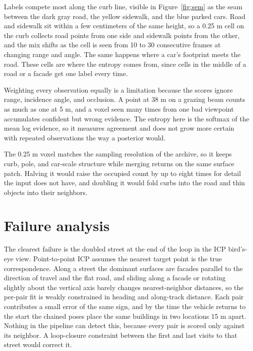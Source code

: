 \documentclass[11pt]{article}
\begin{document}
Labels compete most along the curb line, visible in Figure~\ref{fig:sem} as the seam between the dark gray road, the yellow sidewalk, and the blue parked cars. Road and sidewalk sit within a few centimeters of the same height, so a 0.25 m cell on the curb collects road points from one side and sidewalk points from the other, and the mix shifts as the cell is seen from 10 to 30 consecutive frames at changing range and angle. The same happens where a car's footprint meets the road. These cells are where the entropy comes from, since cells in the middle of a road or a facade get one label every time.

Weighting every observation equally is a limitation because the scores ignore range, incidence angle, and occlusion. A point at 38 m on a grazing beam counts as much as one at 5 m, and a voxel seen many times from one bad viewpoint accumulates confident but wrong evidence. The entropy here is the softmax of the mean log evidence, so it measures agreement and does not grow more certain with repeated observations the way a posterior would.

The 0.25 m voxel matches the sampling resolution of the archive, so it keeps curb, pole, and car-scale structure while merging returns on the same surface patch. Halving it would raise the occupied count by up to eight times for detail the input does not have, and doubling it would fold curbs into the road and thin objects into their neighbors.

\section{Failure analysis}

The clearest failure is the doubled street at the end of the loop in the ICP bird's-eye view. Point-to-point ICP assumes the nearest target point is the true correspondence. Along a street the dominant surfaces are facades parallel to the direction of travel and the flat road, and sliding along a facade or rotating slightly about the vertical axis barely changes nearest-neighbor distances, so the per-pair fit is weakly constrained in heading and along-track distance. Each pair contributes a small error of the same sign, and by the time the vehicle returns to the start the chained poses place the same buildings in two locations 15 m apart. Nothing in the pipeline can detect this, because every pair is scored only against its neighbor. A loop-closure constraint between the first and last visits to that street would correct it.
\end{document}
